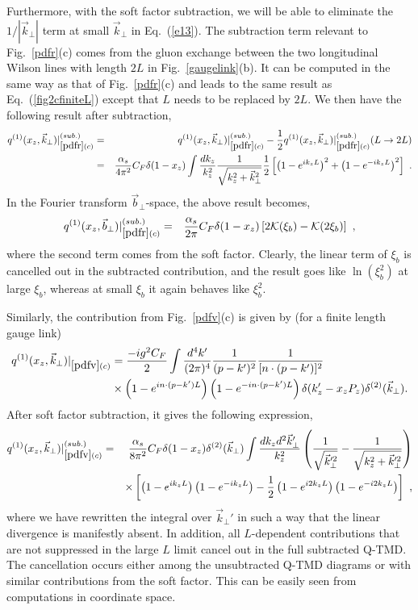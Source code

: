 \documentclass[aps,prd,preprint,tightenlines,superscriptaddress,nofootinbib]{revtex4}
\begin{document}
Furthermore, with the soft factor subtraction, we will be able to eliminate
the $1/|{\vec k}_\perp|$ term at small ${\vec k}_\perp$ in Eq.~(\ref{e13}). The subtraction term relevant to Fig.~\ref{pdfr}(c) comes from the gluon exchange between the two longitudinal Wilson lines with length $2L$ in Fig.~\ref{gaugelink}(b). It can be computed in the same way as that of Fig.~\ref{pdfr}(c) and leads to the same result as Eq.~(\ref{fig2cfiniteL}) except that $L$ needs to be replaced by $2L$. We then have the following result after subtraction,
\begin{eqnarray}
q^{(1)}(x_z,{\vec k}_\perp)|_{\ref{pdfr}(c)}^{(sub.)}&=&q^{(1)}(x_z,{\vec k}_\perp)|_{\ref{pdfr}(c)}^{(sub.)}-\frac{1}{2}q^{(1)}(x_z,{\vec k}_\perp)|_{\ref{pdfr}(c)}^{(sub.)}(L\to 2L)\nonumber\\
&=&\frac{\alpha_s}{4\pi^2}
C_F\delta(1-x_z)\int\frac{dk_z}{k_z^2}\frac{1}{\sqrt{k_z^2+{\vec k}_\perp^2}}
\frac{1}{2}\left[\left(1-e^{ ik_zL}\right)^2+\left(1-e^{ -ik_zL}\right)^2\right]\  .\label{e13p}
\end{eqnarray}
In the Fourier transform ${\vec b}_\perp$-space, the above result becomes,
\begin{eqnarray}
q^{(1)}(x_z,{\vec b}_\perp)|_{\ref{pdfr}(c)}^{(sub.)}&=&\frac{\alpha_s}{2\pi}C_F\delta(1-x_z) \left[2{\cal K}(\xi_b)-{\cal K}(2\xi_b)\right] \ ,
\end{eqnarray}
where the second term comes from the soft factor. Clearly, the linear term of $\xi_b$ is cancelled out in the subtracted contribution, and the result goes like $\ln(\xi_b^2)$ at large $\xi_b$, whereas at small $\xi_b$ it again behaves like $\xi_b^2$.

Similarly, the contribution
from Fig.~\ref{pdfv}(c) is given by (for a finite length gauge link)
\begin{align}
q^{(1)}(x_z,{\vec k}_\perp)|_{\ref{pdfv}(c)}&=\frac{-ig^2 C_F}{2}\int\frac{d^4k'}{(2\pi)^4}\frac{1}{(p-k')^2}\frac{1}{[n\cdot(p-k')]^2}\nonumber\\
&\times\left(1-e^{ in\cdot(p-k')L}\right)\left(1-e^{ -in\cdot(p-k')L}\right)\delta(k'_z-x_z P_z)\delta^{(2)}({\vec k}_\perp).
\end{align}
After soft factor subtraction, it gives the following expression,
\begin{eqnarray}
q^{(1)}(x_z,{\vec k}_\perp)|_{\ref{pdfv}(c)}^{(sub.)}&=&\frac{\alpha_s}{8\pi^2}
C_F\delta(1-x_z)\delta^{(2)}({\vec k}_\perp)\int\frac{dk_zd^2{\vec k}_\perp'}{k_z^2}\left(\frac{1}{\sqrt{{\vec k}_\perp^{\prime 2}}}-\frac{1}{\sqrt{k_z^2+{\vec k}_\perp^{\prime 2}}}\right)\nonumber\\
&&\times \left[\left(1-e^{ ik_zL}\right)\left(1-e^{ -ik_zL}\right)-\frac{1}{2}\left(1-e^{ i2k_zL}\right)\left(1-e^{ -i2k_zL}\right)\right] \ ,\label{e13p2}
\end{eqnarray}
where we have rewritten the integral over ${\vec k}_\perp'$ in such a way that the linear divergence is
manifestly absent. 
In addition, all $L$-dependent contributions that are not suppressed in the large $L$ limit cancel out in the full subtracted Q-TMD. 
The cancellation occurs either among the unsubtracted Q-TMD diagrams or with similar contributions from the soft factor. This 
can be easily seen from computations in coordinate space. 
\end{document}
